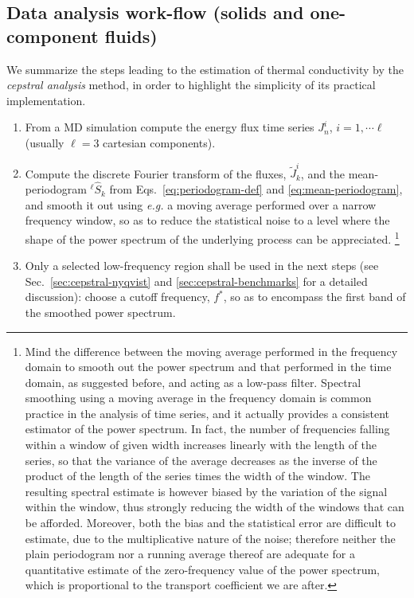 \subsection{Data analysis work-flow (solids and one-component fluids)}  \label{sec:cepstral-workflow-1comp}
We summarize the steps leading to the estimation of thermal conductivity by the \textit{cepstral analysis} method, in order to highlight the simplicity of its practical implementation.
\begin{enumerate}
    \item From a MD simulation compute the energy flux time series $J_n^i$, $i=1,\cdots\ell$ (usually $\ell=3$ cartesian components).
    \item Compute the discrete Fourier transform of the fluxes, $\tilde{J}_k^i$, and the mean-periodogram $^{\ell\!}\hat{S}_k$ from Eqs.~\eqref{eq:periodogram-def} and \eqref{eq:mean-periodogram}, and smooth it out using \emph{e.g.} a moving average \cite{MovingAverage} performed over a narrow frequency window, so as to reduce the statistical noise to a level where the shape of the power spectrum of the underlying process can be appreciated.
    \footnote{Mind the difference between the moving average performed in the frequency domain to smooth out the power spectrum and that performed in the time domain, as suggested before, and acting as a low-pass filter. Spectral smoothing using a moving average in the frequency domain is common practice in the analysis of time series, and it actually provides a consistent estimator of the power spectrum. In fact, the number of frequencies falling within a window of given width increases linearly with the length of the series, so that the variance of the average decreases as the inverse of the product of the length of the series times the width of the window. The resulting spectral estimate is however biased by the variation of the signal within the window, thus strongly reducing the width of the windows that can be afforded. Moreover, both the bias and the statistical error are difficult to estimate, due to the multiplicative nature of the noise; therefore neither the plain periodogram nor a running average thereof are adequate for a quantitative estimate of the zero-frequency value of the power spectrum, which is proportional to the transport coefficient we are after.}
    \item Only a selected low-frequency region shall be used in the next steps (see Sec.~\ref{sec:cepstral-nyqvist} and \ref{sec:cepstral-benchmarks} for a detailed discussion): choose a cutoff frequency, $f^*$, so as to encompass the first band of the smoothed power spectrum. 

\end{enumerate}
